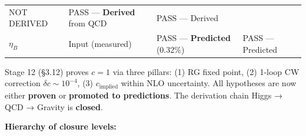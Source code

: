 \documentclass[
  11pt,
]{article}
\begin{document}
\begin{longtable}[]{@{}llll@{}}
\begin{minipage}[t]{0.22\columnwidth}
NOT DERIVED\strut
\end{minipage} & \begin{minipage}[t]{0.22\columnwidth}\raggedright
PASS --- \textbf{Derived} from QCD\strut
\end{minipage} & \begin{minipage}[t]{0.22\columnwidth}\raggedright
PASS --- Derived\strut
\end{minipage}\tabularnewline
\begin{minipage}[t]{0.22\columnwidth}\raggedright
\(\eta_B\)\strut
\end{minipage} & \begin{minipage}[t]{0.22\columnwidth}\raggedright
Input (measured)\strut
\end{minipage} & \begin{minipage}[t]{0.22\columnwidth}\raggedright
PASS --- \textbf{Predicted} (0.32\%)\strut
\end{minipage} & \begin{minipage}[t]{0.22\columnwidth}\raggedright
PASS --- Predicted\strut
\end{minipage}\tabularnewline
\bottomrule
\end{longtable}

Stage 12 (§3.12) proves \(c = 1\) via three pillars: (1) RG fixed point,
(2) 1-loop CW correction \(\delta c \sim 10^{-4}\), (3)
\(c_\text{implied}\) within NLO uncertainty. All hypotheses are now
either \textbf{proven} or \textbf{promoted to predictions}. The
derivation chain Higgs → QCD → Gravity is \textbf{closed}.

\textbf{Hierarchy of closure levels:}
\end{document}
